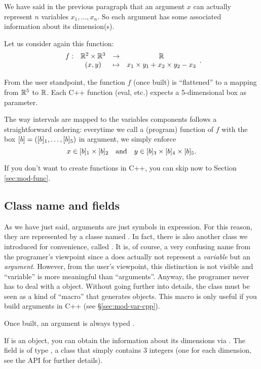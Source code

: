 We have said in the previous paragraph that an argument $x$ can actually represent
$n$ variables $x_1,\ldots,x_n$. So each argument has some associated information about
its dimension(s). 

Let us consider again this function: 
$$\begin{array}{cccc}
f: & \mathbb{R}^2\times\mathbb{R}^3 & \to & \mathbb{R}\\
   &  (x,y) & \mapsto & x_1\times y_1+x_2\times y_2 - x_3
\end{array}.$$

From the user standpoint, the function $f$ (once built) is ``flattened'' to a mapping from $\mathbb{R}^5$ to $\mathbb{R}$.
Each C++ function (eval, etc.) expects a 5-dimensional box as parameter.

The way intervals are mapped to the variables components follows a straightforward ordering:
everytime we call a (program) function of $f$ with the box $[b]=([b]_1,\ldots,[b]_5)$ in argument, we simply enforce
$$x\in[b]_1\times[b]_2 \quad \mbox{and} \quad y\in[b]_3\times[b]_4\times[b]_5.$$

If you don't want to create functions in C++, you can skip now to Section \ref{sec:mod-func}.

\subsection{Class name and fields}

As we have just said, arguments are just symbols in expression. For this reason,
they are represented by a classe named .
In fact, there is also another class we introduced for convenience, called .
It is, of course, a very confusing name from the programer's viewpoint since a 
does actually not represent a {\it variable} but an {\it argument}. However, from the user's viewpoint,
this distinction is not visible and ``variable'' is more meaningful than ``arguments''.
Anyway, the programer never has to deal with a  object. Without going further into details, the 
class must be seen as a kind of ``macro'' that generates  objects. 
This macro is only useful if you build arguments in C++ (see \S\ref{sec:mod-var-cpp}).

Once built, an argument is always typed .

If  is an  object, you can obtain the information about its dimensions via .
The  field is of type , a class that simply contains 3 integers (one for each dimension, see
the API for further details).

